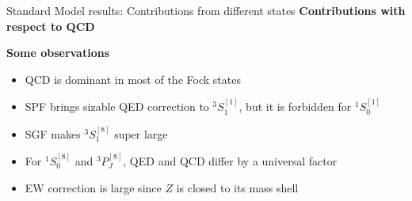 \documentclass[aspectratio=169]{beamer}
\begin{document}
\begin{frame}{Standard Model results: Contributions from different states}
	\vspace{1mm}\hspace{3mm}\textcolor{PittRoyal}{\bf Contributions with respect to QCD}
	\begin{table}[tb]
		\center
	\end{table}
	\vspace{1mm}\hspace{3mm}\textcolor{PittRoyal}{\bf Some observations}
	\begin{itemize}
		\item {\small QCD is dominant in most of the Fock states}
		\item {\small SPF brings sizable QED correction to $^3S_1^{[1]}$, but it is forbidden for $^1S_0^{[1]}$ }
		\item {\small SGF makes $^3S_1^{[8]}$ super large}
		\item {\small For $^1S_0^{[8]}$ and $^3P_J^{[8]}$, QED and QCD differ by a universal factor}
		\item {\small EW correction is large since $Z$ is closed to its mass shell}
	\end{itemize}
\end{frame}
\end{document}
